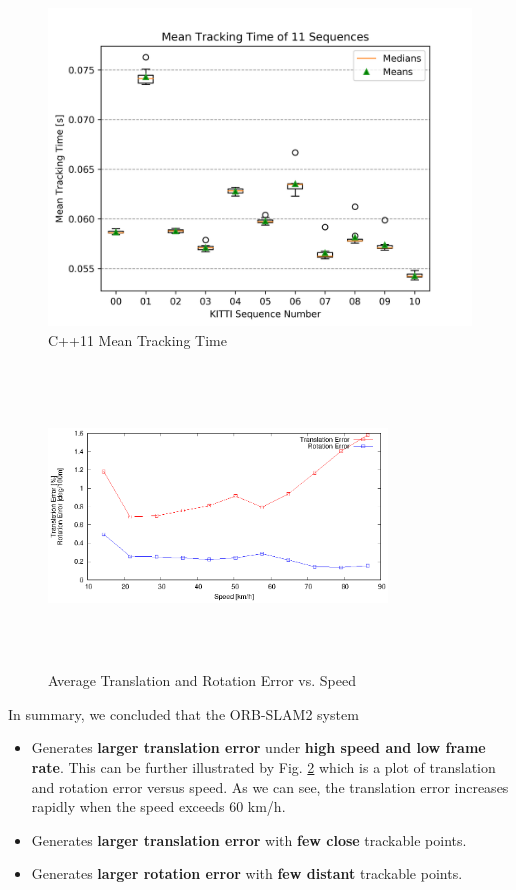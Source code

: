 \documentclass[letterpaper, 10 pt, conference]{IEEEtran}
\begin{document}
\begin{itemize}
    \begin{figure}[htbp]
    \centerline{\includegraphics[scale=0.59]
    {images/Evaluation/C++/mean_track_time.png}}
    \caption{C++11 Mean Tracking Time}
    \label{fig:CTime}
    \end{figure}
\end{itemize}

\begin{figure}[htbp]
\centerline{\includegraphics[width=9cm, height=8cm]
{images/Evaluation/C++/Avg_speed_tranroterr.eps}}
\caption{Average Translation and Rotation Error vs. Speed}
\label{fig:AvgSpeed}
\end{figure}

In summary, we concluded that the ORB-SLAM2 system
\begin{itemize}
    \item Generates \textbf{larger translation error} under \textbf{high speed
    and low frame rate}. This can be further illustrated by Fig.
    \ref{fig:AvgSpeed} which is a plot of translation and rotation error versus
    speed. As we can see, the translation error increases rapidly when the speed
    exceeds 60 km/h. 
    \item Generates \textbf{larger translation error} with \textbf{few close}
    trackable points.
    \item Generates \textbf{larger rotation error} with \textbf{few distant}
    trackable points.
\end{itemize}
\end{document}
